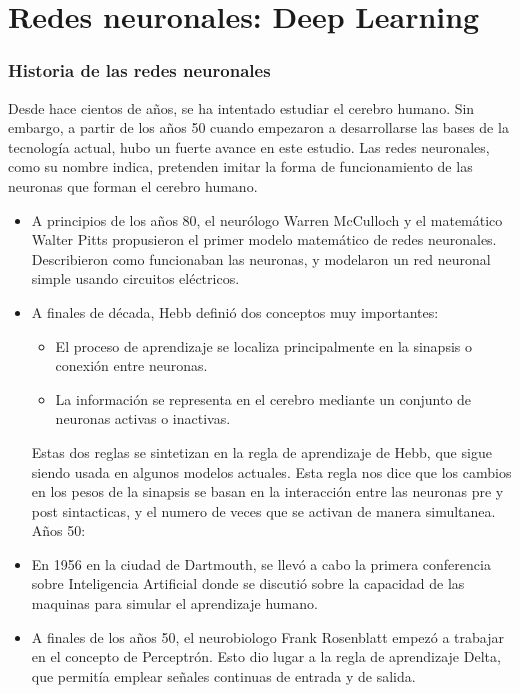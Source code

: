 \chapter{Redes neuronales: Deep Learning}
\subsection {Historia de las redes neuronales}
Desde hace cientos de años, se ha intentado estudiar el cerebro humano. Sin embargo, a partir de los años 50 cuando empezaron a desarrollarse las bases de la tecnología actual, hubo un fuerte avance en este estudio. Las redes neuronales, como su nombre indica, pretenden imitar la forma de funcionamiento de las neuronas que forman el cerebro humano.
\begin{itemize}
\\Años 40:\\
\item A principios de los años 80, el neurólogo Warren McCulloch y el matemático Walter Pitts propusieron el primer modelo matemático de redes neuronales. Describieron como funcionaban las neuronas, y modelaron un red neuronal simple usando circuitos eléctricos.
\item A finales de década, Hebb definió dos conceptos muy importantes:
\begin{itemize}
\item El proceso de aprendizaje se localiza principalmente en la sinapsis o conexión entre neuronas.
\item La información se representa en el cerebro mediante un conjunto de neuronas activas o inactivas.
\end{itemize}
Estas dos reglas se sintetizan en la regla de aprendizaje de Hebb, que sigue siendo usada en algunos modelos actuales. Esta regla nos dice que los cambios en los pesos de la sinapsis se basan en la interacción entre las neuronas pre y post sintacticas, y el numero de veces que se activan de manera simultanea.
\\Años 50:\\
\item En 1956 en la ciudad de Dartmouth, se llevó a cabo la primera conferencia sobre Inteligencia Artificial donde se discutió sobre la capacidad de las maquinas para simular el aprendizaje humano.
\item A finales de los años 50,  el neurobiologo Frank Rosenblatt empezó a trabajar en el concepto de Perceptrón. Esto dio lugar a la regla de aprendizaje Delta, que permitía emplear señales continuas de entrada y de salida.

\end{itemize}

